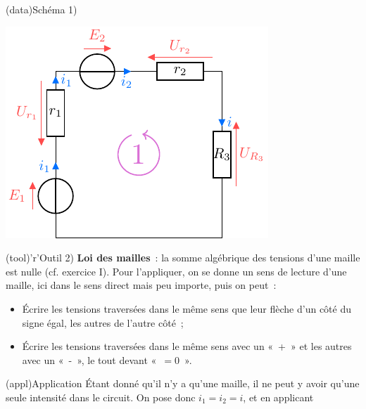 \documentclass[../../main/main.tex]{subfiles}
\begin{document}
{}{
\begin{tcbraster}[raster columns=5, raster equal height=rows]
    \begin{tcb}[raster multicolumn=2](data){Schéma}
        1)\vspace*{-20pt}
        \begin{center}
            \includegraphics{assogen_ser}
        \end{center}
    \end{tcb}
    \begin{tcb}[raster multicolumn=3](tool)'r'{Outil}
        2)
        \textbf{Loi des mailles}~: la somme algébrique des tensions d'une maille
        est nulle (cf. exercice I). Pour l'appliquer, on se donne un
        sens de lecture d'une maille, ici dans le sens direct mais peu importe,
        puis on peut~:
        \begin{itemize}
            \item Écrire les tensions traversées dans le même sens que leur
                flèche d'un côté du signe égal, les autres de l'autre côté~;
            \item Écrire les tensions traversées dans le même sens avec un «~+~»
                et les autres avec un «~-~», le tout devant «~$=0$~».
        \end{itemize}
    \end{tcb}
\end{tcbraster}
\begin{tcbraster}[raster columns=9, raster equal height=rows]
    \begin{tcb}[raster multicolumn=4](appl){Application}
        Étant donné qu'il n'y a qu'une maille, il ne peut y avoir qu'une seule
        intensité dans le circuit. On pose donc $i_1 = i_2 = i$, et en applicant

\end{tcb}
\end{tcbraster}}
\end{document}
